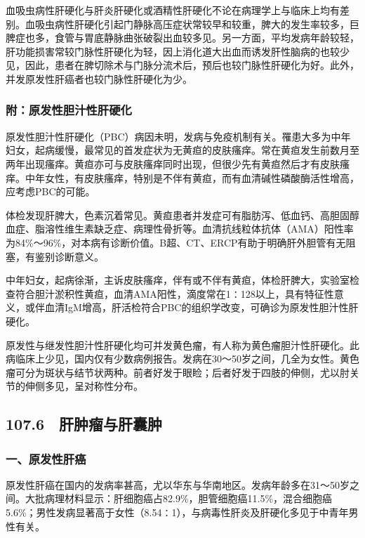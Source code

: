 血吸虫病性肝硬化与肝炎肝硬化或酒精性肝硬化不论在病理学上与临床上均有差别。血吸虫病性肝硬化引起门静脉高压症状常较早和较重，脾大的发生率较多，巨脾症也多，食管与胃底静脉曲张破裂出血较多见。另一方面，平均发病年龄较轻，肝功能损害常较门脉性肝硬化为轻，因上消化道大出血而诱发肝性脑病的也较少见，因此，患者在脾切除术与门脉分流术后，预后也较门脉性肝硬化为好。此外，并发原发性肝癌者也较门脉性肝硬化为少。

\subsubsection{附：原发性胆汁性肝硬化}

原发性胆汁性肝硬化（PBC）病因未明，发病与免疫机制有关。罹患大多为中年妇女，起病缓慢，最常见的首发症状为无黄疸的皮肤瘙痒。常在黄疸发生前数月至两年出现瘙痒。黄疸亦可与皮肤瘙痒同时出现，但很少先有黄疸然后才有皮肤瘙痒。中年女性，有皮肤瘙痒，特别是不伴有黄疸，而有血清碱性磷酸酶活性增高，应考虑PBC的可能。

体检发现肝脾大，色素沉着常见。黄疸患者并发症可有脂肪泻、低血钙、高胆固醇血症、脂溶性维生素缺乏症、病理性骨折等。血清抗线粒体抗体（AMA）阳性率为84\%～96\%，对本病有诊断价值。B超、CT、ERCP有助于明确肝外胆管有无阻塞，有鉴别诊断意义。

中年妇女，起病徐渐，主诉皮肤瘙痒，伴有或不伴有黄疸，体检肝脾大，实验室检查符合胆汁淤积性黄疸，血清AMA阳性，滴度常在1∶128以上，具有特征性意义，或伴血清IgM增高，肝活检符合PBC的组织学改变，可确诊为原发性胆汁性肝硬化。

原发性与继发性胆汁性肝硬化均可并发黄色瘤，有人称为黄色瘤胆汁性肝硬化。此病临床上少见，国内仅有少数病例报告。发病在30～50岁之间，几全为女性。黄色瘤可分为斑状与结节状两种。前者好发于眼睑；后者好发于四肢的伸侧，尤以肘关节的伸侧多见，呈对称性分布。

\subsection{107.6　肝肿瘤与肝囊肿}

\subsubsection{一、原发性肝癌}

原发性肝癌在国内的发病率甚高，尤以华东与华南地区。发病年龄多在31～50岁之间。大批病理材料显示：肝细胞癌占82.9\%，胆管细胞癌11.5\%，混合细胞癌5.6\%；男性发病显著高于女性（8.54∶1），与病毒性肝炎及肝硬化多见于中青年男性有关。


